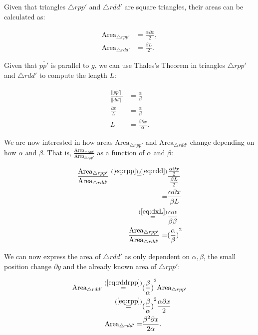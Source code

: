 Given that triangles $\triangle rpp'$ and $\triangle rdd'$ are square triangles, their areas can be calculated as:

\begin{align}
    \text{Area}_{\triangle rpp'} &= \frac{\alpha \partial x}{2}, \label{eq:rpp}\\
    \text{Area}_{\triangle rdd'} &= \frac{\beta L}{2}. \label{eq:rdd}   
\end{align}


Given that $\overline{pp'}$ is parallel to $g$, we can use Thales's Theorem in triangles $\triangle rpp'$ and $\triangle rdd'$ to compute the length $L$: 

\begin{align}
    \frac{||\overline{pp'}||}{||\overline{dd'}||} &= \frac \alpha \beta \\
    \frac{\partial x}{L} &= \frac \alpha \beta  \label{eq:dxL} \\
    L &= \frac{\beta \partial x}{\alpha}. \label{eq:L}
\end{align}



We are now interested in how areas $\text{Area}_{\triangle rpp'}$ and $\text{Area}_{\triangle rdd'}$ change depending on how $\alpha$ and $\beta$. That is, $\frac{\text{Area}_{\triangle rdd'}}{\text{Area}_{\triangle rpp'}}$ as a function of $\alpha$ and $\beta$: 

\begin{align}
    \frac{\text{Area}_{\triangle rpp'}}{\text{Area}_{\triangle rdd'}} \overset{(\ref{eq:rpp}), (\ref{eq:rdd})}{=} &\frac{\frac{\alpha \partial x}{2}}{\frac{\beta L}{2}} \\
    = &\frac{\alpha \partial x}{\beta L} \\
    \overset{(\ref{eq:dxL})}{=} &\frac{\alpha \alpha}{\beta \beta} \\
    \frac{\text{Area}_{\triangle rpp'}}{\text{Area}_{\triangle rdd'}} = &{(\frac \alpha \beta)}^2 \label{eq:rddrpp}
\end{align}

We can now express the area of $\triangle rdd'$ as only dependent on $\alpha, \beta$, the small position change $\partial y$ and the already known area of $\triangle rpp'$:

\begin{align}
    \text{Area}_{\triangle rdd'} \overset{(\ref{eq:rddrpp})}{=} &{(\frac \beta \alpha)}^2 \text{Area}_{\triangle rpp'} \\
    \overset{(\ref{eq:rpp})}{=} &{(\frac \beta \alpha)}^2 \frac{\alpha \partial x}{2} \\
    \text{Area}_{\triangle rdd'} = &\frac{\beta^2 \partial x}{2\alpha}. \label{eq:ardd}
\end{align}

